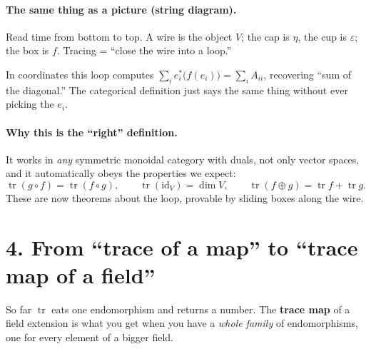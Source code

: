 \documentclass[11pt]{article}
\newcommand{\id}{\mathrm{id}}
\newcommand{\coev}{\eta}   %
\newcommand{\ev}{\varepsilon} %
\newcommand{\tr}{\operatorname{tr}}
\begin{document}
\paragraph{The same thing as a picture (string diagram).}
Read time from bottom to top. A wire is the object $V$; the cap is $\coev$, the
cup is $\ev$; the box is $f$. Tracing = ``close the wire into a loop.''

\begin{center}
\end{center}

\noindent In coordinates this loop computes $\sum_i e_i^{*}\big(f(e_i)\big)
=\sum_i A_{ii}$, recovering ``sum of the diagonal.'' The categorical definition
just says the same thing without ever picking the $e_i$.

\paragraph{Why this is the ``right'' definition.}
It works in \emph{any} symmetric monoidal category with duals, not only vector
spaces, and it automatically obeys the properties we expect:
\[
\tr(g\circ f)=\tr(f\circ g),\qquad \tr(\id_V)=\dim V,\qquad
\tr(f\oplus g)=\tr f+\tr g .
\]
These are now theorems about the loop, provable by sliding boxes along the wire.

\section*{4. From ``trace of a map'' to ``trace map of a field''}

So far $\tr$ eats one endomorphism and returns a number. The \textbf{trace map}
of a field extension is what you get when you have a \emph{whole family} of
endomorphisms, one for every element of a bigger field.
\end{document}
